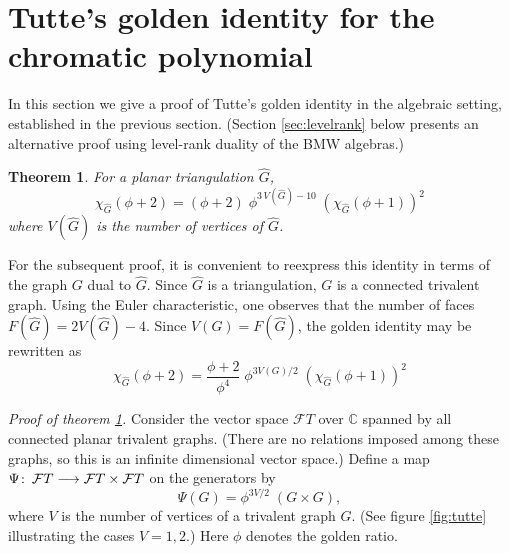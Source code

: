 \documentclass[11pt]{amsart}
\newtheorem{theorem}{Theorem}
\numberwithin{equation}{section}
\theoremstyle{definition}
\newcommand{\co}{\colon\thinspace}
\begin{document}
\medskip

\section{Tutte's golden identity for the chromatic polynomial} \label{golden section}

In this section we give a proof of
Tutte's golden identity in the algebraic setting, established in the previous section. (Section
\ref{sec:levelrank} below presents an alternative proof using level-rank duality of the BMW algebras.)

\smallskip

\begin{theorem} \label{Tutte} \sl For a planar triangulation $\widehat G$,
\begin{equation}  {\chi}_{\widehat G}({\phi}+2)=({\phi}+2)\; {\phi}^{3\,V(\widehat G)-10}\; ({\chi}_{\widehat G}({\phi}+1))^2\end{equation}
where $V(\widehat G)$ is the number of vertices of $\widehat G$.
\end{theorem}

\smallskip



For the subsequent proof, it is convenient to reexpress this identity
in terms of the graph $G$ dual to $\widehat G$. Since
$\widehat G$ is a triangulation, $G$ is a connected trivalent graph.
Using the Euler characteristic, one observes that the number of
faces $F(\widehat
G)=2V(\widehat G)-4$. Since $V(G)=F(\widehat G)$,
the golden identity may be rewritten as
\begin{equation} \label{Tutte's identity2} {\chi}_{\widehat
    G}({\phi}+2)=
\frac{{\phi}+2}{\phi^4}\; {\phi}^{3 V(G)/2}\;
({\chi}_{\widehat G}({\phi}+1))^2
\end{equation}


{\em Proof of theorem \ref{Tutte}.} Consider the vector space
${\mathcal FT}$ over ${\mathbb C}$ spanned by all connected planar
trivalent graphs. (There are no relations imposed among these graphs,
so this is an infinite dimensional vector space.)  Define a map $\Psi
\co {\mathcal FT}\longrightarrow {\mathcal FT}\times {\mathcal FT}$ on
the generators by \begin{equation} \label{Psi}{\Psi}(G)={\phi}^{3V/2}\; (G\times G),
\end{equation} where $V$
is the number of vertices of a trivalent graph $G$. (See figure \ref{fig:tutte}
illustrating the cases $V=1,2$.) Here ${\phi}$ denotes the golden
ratio.
\end{document}

